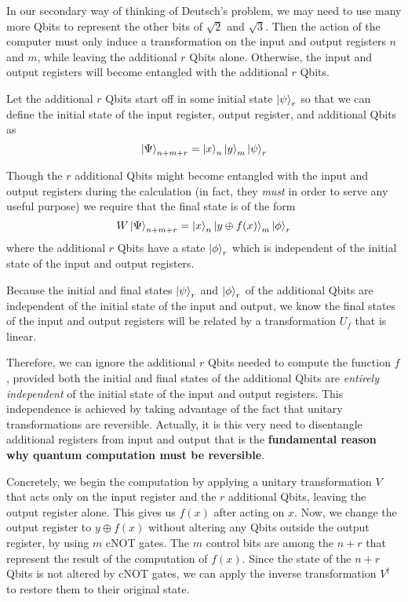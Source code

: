 \documentclass[letterpaper]{article}
\begin{document}
In our secondary way of thinking of Deutsch's problem, we may need to use many more Qbits to represent the other bits of $\sqrt{2}$ and $\sqrt{3}$. Then the action of the computer must only induce a transformation on the input and output registers $n$ and $m$, while leaving the additional $r$ Qbits alone. Otherwise, the input and output registers will become entangled with the additional $r$ Qbits. 

Let the additional $r$ Qbits start off in some initial state $\ket{\psi}_{r}$ so that we can define the initial state of the input register, output register, and additional Qbits as 
$$\ket{\Psi}_{n+m+r} = \ket{x}_{n} \ket{y}_{m} \ket{\psi}_{r} $$ 

Though the $r$ additional Qbits might become entangled with the input and output registers during the calculation (in fact, they \textsl{must} in order to serve any useful purpose) we require that the final state is of the form 
$$ W\ket{\Psi}_{n+m+r} = \ket{x}_{n} \ket{y \oplus f(x)}_{m} \ket{\phi}_{r} $$
where the additional $r$ Qbits have a state $\ket{\phi}_{r}$ which is independent of the initial state of the input and output registers.

Because the initial and final states $\ket{\psi}_{r}$ and $\ket{\phi}_{r}$ of the additional Qbits are independent of the initial state of the input and output, we know the final states of the input and output registers will be related by a transformation $U_{f}$ that is linear. 

Therefore, we can ignore the additional $r$ Qbits needed to compute the function $f$, provided both the initial and final states of the additional Qbits are \textsl{entirely independent} of the initial state of the input and output registers. This independence is achieved by taking advantage of the fact that unitary transformations are reversible. Actually, it is this very need to disentangle additional registers from input and output that is the \textbf{fundamental reason why quantum computation must be reversible}. 

Concretely, we begin the computation by applying a unitary transformation $V$ that acts only on the input register and the $r$ additional Qbits, leaving the output register alone. This gives us $f(x)$ after acting on $x$. Now, we change the output register to $y \oplus f(x)$ without altering any Qbits outside the output register, by using $m$ cNOT gates. The $m$ control bits are among the $n + r$ that represent the result of the computation of $f(x)$. Since the state of the $n + r$ Qbits is not altered by cNOT gates, we can apply the inverse transformation $V^{\dagger}$ to restore them to their original state. 
\end{document}
